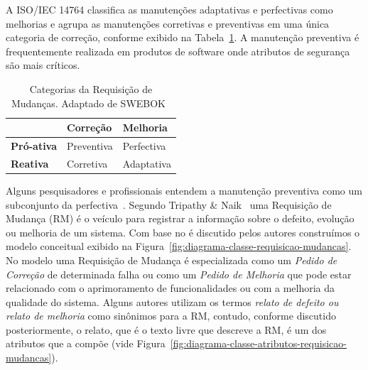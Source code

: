 A ISO/IEC 14764 classifica as manutenções adaptativas e perfectivas como
me\-lho\-ri\-as e agrupa as manutenções corretivas e preventivas em uma única
categoria de correção, conforme exibido na
Tabela~\ref{tab:categorias_requisicao_mudanca}. A manutenção preventiva é
frequentemente realizada em produtos de software onde atributos de segurança são
mais críticos.

\begin{table}[htpb] \centering 	\begin{tabular}{l|l|l|} \cline{2-3} &
		\textbf{Correção} & \textbf{Melhoria} \\ \hline
		\multicolumn{1}{|l|}{\textbf{Pró-ativa}} & Preventiva & Perfectiva \\
		\hline \multicolumn{1}{|l|}{\textbf{Reativa}} & Corretiva & Adaptativa
		\\ \hline \end{tabular}\caption{Categorias da Requisição de Mudanças.
		Adaptado de
		SWEBOK~\cite{4425813}}\label{tab:categorias_requisicao_mudanca}
\end{table}


Alguns pesquisadores e profissionais entendem a manutenção preventiva como um
subconjunto da perfectiva~\cite{thipathy2014software}.  Segundo Tripathy \&
Naik~\cite{tripathy2014software} uma Requisição de Mudança (RM) é o veículo para
registrar a informação sobre o defeito, evolução ou melhoria de um sistema.  Com
base no é discutido pelos autores construímos o modelo conceitual exibido na
Figura~\ref{fig:diagrama-classe-requisicao-mudancas}. No modelo uma Requisição
de Mudança é especializada como um \textit{Pedido de Correção} de determinada
falha ou como um \textit{Pedido de Melhoria} que pode estar relacionado com o
aprimoramento de funcionalidades ou com a melhoria da qualidade do sistema.
Alguns autores utilizam os termos \textit{relato de defeito ou relato de
	melhoria} como sinônimos para a RM, contudo, conforme discutido
posteriormente, o relato, que é o texto livre que descreve a RM, é um dos
atributos que a compõe (vide
Figura~\ref{fig:diagrama-classe-atributos-requisicao-mudancas}).

